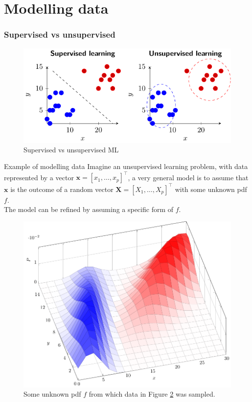 \documentclass{beamer}
\begin{document}
\section{Modelling data}


\begin{frame}
  \frametitle{Supervised vs unsupervised}
    
    \begin{figure}
      \includegraphics{supervised_unsupervised}
      \caption{Supervised vs unsupervised ML}
      \label{fig:supunsup}
    \end{figure}
  
  \end{frame}

\begin{frame}[allowframebreaks]{Example of modelling data}
  \label{sld:model}
  Imagine an unsupervised learning problem, with data represented by a vector $\mathbf{x}=[x_1,\ldots,x_p]^\intercal$, a very general model is to assume that $\mathbf{x}$ is the outcome of a random vector $\mathbf{X}=[X_1,\ldots,X_p]^\intercal$ with some unknown pdf $f$.\\[2ex]
 
  The model can be refined by assuming a specific form of $f$.

  \begin{figure}
    \includegraphics[width=0.5\linewidth]{2dbivariate}
    \caption{Some unknown pdf $f$ from which data in Figure \ref{fig:supunsup} was sampled.}
    \label{fig:supunsup}
  \end{figure}
\end{frame}
\end{document}
